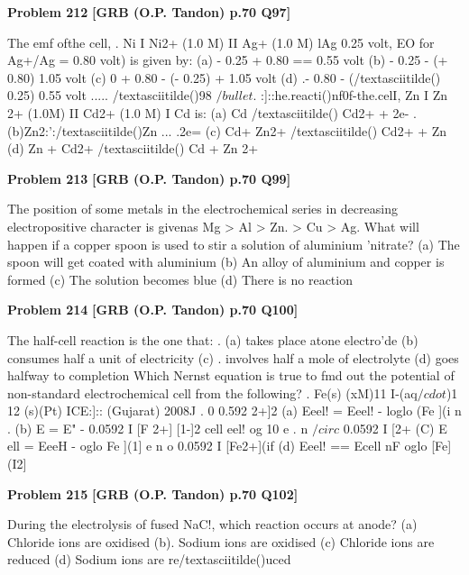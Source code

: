 \begin{problembox}
\textbf{Problem 212} \hfill \textbf{[GRB (O.P. Tandon) p.70 Q97]}
\label{q:ext-grb_all_questions-212}

The emf ofthe cell, . 
Ni I Ni2+ (1.0 M) II Ag+ (1.0 M) lAg 
0.25 volt, EO for Ag+/Ag = 0.80 volt) 
is given by: 
(a) - 0.25 + 0.80 == 0.55 volt 
(b) - 0.25 - (+ 0.80) 
1.05 volt 
(c) 0 + 0.80 - (- 0.25) 
+ 1.05 volt 
(d) .- 0.80 -
(/textasciitilde() 0.25) 
0.55 volt 
..... /textasciitilde()98 $/bullet$. :]::he.reacti()nf0f-the.celI, 
Zn I Zn 2+ (1.0M) II Cd2+ (1.0 M) I Cd 
is: 
(a) Cd /textasciitilde() 
Cd2+ + 2e-
.(b)Zn2:':/textasciitilde()Zn ... .2e= 
(c) Cd+ Zn2+ /textasciitilde() 
Cd2+ + Zn 
(d) Zn + Cd2+ /textasciitilde() 
Cd + Zn 2+
\end{problembox}

\begin{problembox}
\textbf{Problem 213} \hfill \textbf{[GRB (O.P. Tandon) p.70 Q99]}
\label{q:ext-grb_all_questions-213}

The position of some metals in the electrochemical series in 
decreasing electropositive character is givenas Mg > Al > Zn. 
> Cu > Ag. What will happen if a copper spoon is used to stir a 
solution of aluminium 'nitrate? 
(a) The spoon will get coated with aluminium 
(b) An alloy of aluminium and copper is formed 
(c) The solution becomes blue 
(d) There is no reaction
\end{problembox}

\begin{problembox}
\textbf{Problem 214} \hfill \textbf{[GRB (O.P. Tandon) p.70 Q100]}
\label{q:ext-grb_all_questions-214}

The half-cell reaction is the one that: 
. 
(a) takes place atone electro'de 
(b) consumes half a unit of electricity 
(c) . involves half a mole of electrolyte 
(d) goes halfway to completion 
Which Nernst equation is true to fmd out the potential of 
non-standard electrochemical cell from the following? . 
Fe(s) 
(xM)11 I-(aq$/cdot$)1 12 (s)(Pt) 
ICE:]:: (Gujarat) 2008J 
. 
0 
0.592 
2+]2 
(a) Eeel! = Eeel! -
loglo (Fe ](i 
n 
. 
(b) E 
= E" - 0.0592 I 
[F 2+] [1-]2 
cell 
eel! 
og 10 
e 
. 
n 
$/circ$ 
0.0592 I 
[2+ 
(C) E ell = EeeH -
oglo Fe ](1] 
e 
n 
o 
0.0592 I 
[Fe2+](if 
(d) Eeel! == Ecell 
nF 
oglo 
[Fe](I2]
\end{problembox}

\begin{problembox}
\textbf{Problem 215} \hfill \textbf{[GRB (O.P. Tandon) p.70 Q102]}
\label{q:ext-grb_all_questions-215}

During the electrolysis of fused NaC!, which reaction occurs 
at anode? 
(a) Chloride ions are oxidised 
(b). Sodium ions are oxidised 
(c) Chloride ions are reduced 
(d) Sodium ions are re/textasciitilde()uced
\end{problembox}

